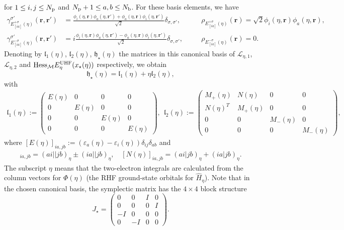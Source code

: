 \documentclass[11pt]{article}
\begin{document}
for $1\le i,j\le N_{\rm p}$ and $N_{\rm p}+1\le a,b\le N_{\rm b}$. For these basis elements, we have
\begin{align*}
\gamma_{E_{[ia]}^{+\sigma}(\eta)}^{\sigma'}(\mathbf r, \mathbf r') &= \frac{\phi_i(\eta,\mathbf r) {\phi_a(\eta,\mathbf r')}+\phi_a(\eta,\mathbf r) {\phi_i(\eta, \mathbf r')}}{\sqrt 2} \delta_{\sigma,\sigma'}, \quad && \rho_{E_{[ia]}^{+\sigma}(\eta)}(\mathbf r) = \sqrt 2 \phi_i(\eta,\mathbf r) {\phi_a(\eta,\mathbf r)}, \\
\gamma_{E_{[ia]}^{-\sigma}(\eta)}^{\sigma'}(\mathbf r, \mathbf r') &= i\frac{\phi_i(\eta,\mathbf r) {\phi_a(\eta,\mathbf r')}-\phi_a(\eta,\mathbf r) {\phi_i(\eta, \mathbf r')}}{\sqrt 2} \delta_{\sigma,\sigma'}, \quad && \rho_{E_{[ia]}^{-\sigma}(\eta)}(\mathbf r)=0.
\end{align*}
Denoting by $\mathfrak l_{1}(\eta)$, $\mathfrak l_{2}(\eta)$, $\mathfrak h_\star(\eta)$ the matrices in this canonical basis of ${\mathcal L}_{\eta,1}$, ${\mathcal L}_{\eta,2}$ and ${\rm Hess}_{\mathcal M} E^{\rm UHF}_\eta (x_\star(\eta))$ respectively, we obtain
\begin{equation}
    \mathfrak h_\star(\eta) = \mathfrak l_{1}(\eta) + \eta \mathfrak l_{2}(\eta),
    \label{eqn:matrix rep of Riemannian Hessian UHF}
\end{equation}
with 
\begin{align*}
\mathfrak l_{1}(\eta):=\left( \begin{array}{cccc} E(\eta) & 0 & 0 & 0 \\ 0 & E(\eta) & 0 & 0  \\ 0 & 0 & E(\eta) & 0 \\ 0 & 0 & 0 & E(\eta)\end{array} \right),~~ 
\mathfrak l_{2}(\eta):= \left( \begin{array}{cccc} M_+(\eta) & N(\eta) & 0 & 0 \\ N (\eta)^T & M_+(\eta)  & 0 & 0  \\ 0 & 0 & M_-(\eta) & 0 \\ 0 & 0 & 0 & M_-(\eta) \end{array} \right),
\end{align*}
where $[E(\eta)]_{ia,jb} :=(\varepsilon_a(\eta)-\varepsilon_i(\eta)) \delta_{ij} \delta_{ab}$ and 
\begin{align*}
    [M_\pm(\eta)]_{ia,jb}=(ai||jb)_\eta\pm(ia||jb)_\eta,\quad[N(\eta)]_{ia,jb}=(ai|jb)_\eta+(ia|jb)_\eta.
\end{align*}
The subscript $\eta$ means that the two-electron integrals are calculated from the column vectors for $\Phi(\eta)$ (the RHF ground-state orbitals for $\widehat H_\eta$).
Note that in the chosen canonical basis, the symplectic matrix has the $4 \times 4$ block structure
$$
J_\star = \left( \begin{array}{cccc} 0 & 0 & I & 0 \\ 0 & 0 & 0 & I  \\ -I & 0 & 0 & 0 \\ 0 & -I & 0 & 0\end{array} \right).
$$
\end{document}

